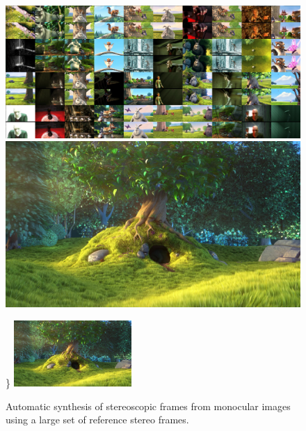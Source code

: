
\newcommand{\bracedincludegraphics}[2][]{%
  \sbox0{$\vcenter{\hbox{\texttt{[image: \#2]}}}$}%
  \left\lbrace
    \vphantom{\copy0}
  \right.\kern-\nulldelimiterspace
}

\begin{figure}
	\centering
	\begin{minipage}{0.4\textwidth}
		\includegraphics[width=\textwidth]{figures/teaser_montage}\\
		\includegraphics[width=\textwidth]{figures/teaser_left}
	\end{minipage}
	\quad
	\Large\}
	\quad
	\includegraphics[width=0.4\textwidth]{figures/teaser_right}
	\caption{Automatic synthesis of stereoscopic frames from monocular images using a large set of reference stereo frames.}
	\label{fig:teaser}
\end{figure}
